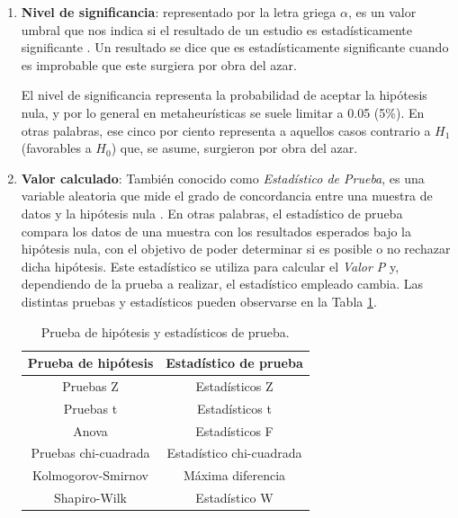 \begin{enumerate}
\begin{itemize}
\begin{enumerate}
            \item \textbf{Nivel de significancia}: representado por la letra griega $\alpha$, es un valor umbral que nos indica si el resultado de un estudio es estadísticamente significante \cite{Devore2012}. Un resultado se dice que es estadísticamente significante cuando es improbable que este surgiera por obra del azar.

            El nivel de significancia representa la probabilidad de aceptar la hipótesis nula, y por lo general en metaheurísticas se suele limitar a 0.05 (5\%). En otras palabras, ese cinco por ciento representa a aquellos casos contrario a $H_1$ (favorables a $H_0$) que, se asume, surgieron por obra del azar.

            \item \textbf{Valor calculado}: También conocido como \textit{Estadístico de Prueba}, es una variable aleatoria que mide el grado de concordancia entre una muestra de datos y la hipótesis nula \cite{Devore2012}. En otras palabras, el estadístico de prueba compara los datos de una muestra con los resultados esperados bajo la hipótesis nula, con el objetivo de poder determinar si es posible o no rechazar dicha hipótesis. Este estadístico se utiliza para calcular el \textit{Valor P} y, dependiendo de la prueba a realizar, el estadístico empleado cambia. Las distintas pruebas y estadísticos pueden observarse en la Tabla \ref{tab:pruebas-hipo}.

            \begin{table}[ht!]
            \centering
            \begin{tabular}{|c|c|}\hline
                Prueba de hipótesis & Estadístico de prueba \\\hline

                Pruebas Z & Estadísticos Z \\

                Pruebas t & Estadísticos t \\

                Anova & Estadísticos F \\

                Pruebas chi-cuadrada & Estadístico chi-cuadrada \\

                Kolmogorov-Smirnov & Máxima diferencia \\

                Shapiro-Wilk & Estadístico W \\\hline
            \end{tabular}
            \caption{Prueba de hipótesis y estadísticos de prueba.}
            \label{tab:pruebas-hipo}
            \end{table}


\end{enumerate}
\end{itemize}
\end{enumerate}
